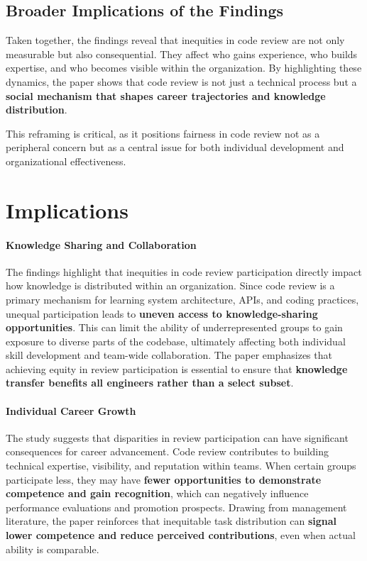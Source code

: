 \subsection{Broader Implications of the Findings}
Taken together, the findings reveal that inequities in code review are not only measurable but also consequential. They affect who gains experience, who builds expertise, and who becomes visible within the organization. By highlighting these dynamics, the paper shows that code review is not just a technical process but a \textbf{social mechanism that shapes career trajectories and knowledge distribution}.

This reframing is critical, as it positions fairness in code review not as a peripheral concern but as a central issue for both individual development and organizational effectiveness.

\section{Implications}
\paragraph{Knowledge Sharing and Collaboration}
The findings highlight that inequities in code review participation directly impact how knowledge is distributed within an organization. Since code review is a primary mechanism for learning system architecture, APIs, and coding practices, unequal participation leads to \textbf{uneven access to knowledge-sharing opportunities}. This can limit the ability of underrepresented groups to gain exposure to diverse parts of the codebase, ultimately affecting both individual skill development and team-wide collaboration. The paper emphasizes that achieving equity in review participation is essential to ensure that \textbf{knowledge transfer benefits all engineers rather than a select subset}.

\paragraph{Individual Career Growth}
The study suggests that disparities in review participation can have significant consequences for career advancement. Code review contributes to building technical expertise, visibility, and reputation within teams. When certain groups participate less, they may have \textbf{fewer opportunities to demonstrate competence and gain recognition}, which can negatively influence performance evaluations and promotion prospects. Drawing from management literature, the paper reinforces that inequitable task distribution can \textbf{signal lower competence and reduce perceived contributions}, even when actual ability is comparable.

